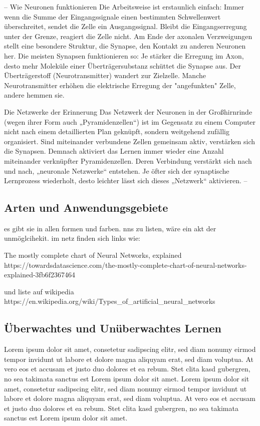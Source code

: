--
Wie Neuronen funktionieren
Die Arbeitsweise ist erstaunlich einfach:
Immer wenn die Summe der Eingangssignale einen bestimmten Schwellenwert überschreitet,
sendet die Zelle ein Ausgangssignal.
Bleibt die Eingangserregung unter der Grenze, reagiert die Zelle nicht.
Am Ende der axonalen Verzweigungen stellt eine besondere Struktur, die Synapse,
den Kontakt zu anderen Neuronen her.
Die meisten Synapsen funktionieren so:
Je stärker die Erregung im Axon, desto mehr Moleküle einer Überträgersubstanz
schüttet die Synapse aus. Der Überträgerstoff (Neurotransmitter) wandert zur Zielzelle.
Manche Neurotransmitter erhöhen die elektrische Erregung der "angefunkten" Zelle,
andere hemmen sie. 

Die Netzwerke der Erinnerung
Das Netzwerk der Neuronen in der Großhirnrinde (wegen ihrer Form auch „Pyramidenzellen“)
ist im Gegensatz zu einem Computer nicht nach einem detaillierten Plan geknüpft,
sondern weitgehend zufällig organisiert.
Sind miteinander verbundene Zellen gemeinsam aktiv, verstärken sich die Synapsen.
Demnach aktiviert das Lernen immer wieder eine Anzahl miteinander verknüpfter
Pyramidenzellen. Deren Verbindung verstärkt sich nach und nach,
„neuronale Netzwerke“ entstehen.
Je öfter sich der synaptische Lernprozess wiederholt, desto leichter
lässt sich dieses „Netzwerk“ aktivieren. 
--

\subsection{Arten und Anwendungsgebiete}

es gibt sie in allen formen und farben. nns zu listen, wäre ein akt der unmöglcihekit. 
im netz finden sich links wie:

The mostly complete chart of Neural Networks, explained
https://towardsdatascience.com/the-mostly-complete-chart-of-neural-networks-explained-3fb6f2367464

und
liste auf wikipedia
https://en.wikipedia.org/wiki/Types\_of\_artificial\_neural\_networks


\subsection{Überwachtes und Unüberwachtes Lernen}
Lorem ipsum dolor sit amet, consetetur sadipscing elitr, sed diam nonumy eirmod tempor invidunt ut labore et dolore magna aliquyam erat, sed diam voluptua. At vero eos et accusam et justo duo dolores et ea rebum. Stet clita kasd gubergren, no sea takimata sanctus est Lorem ipsum dolor sit amet. Lorem ipsum dolor sit amet, consetetur sadipscing elitr, sed diam nonumy eirmod tempor invidunt ut labore et dolore magna aliquyam erat, sed diam voluptua. At vero eos et accusam et justo duo dolores et ea rebum. Stet clita kasd gubergren, no sea takimata sanctus est Lorem ipsum dolor sit amet.

